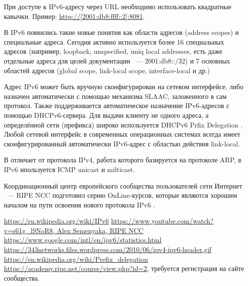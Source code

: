 \documentclass[10pt, a5paper]{article}
\begin{document}
При доступе к IPv6-адресу через URL необходимо использовать квадратные кавычки. Пример: \url{ http://[2001:db8:ffff::2]:8081}.

В IPv6 появились такие новые понятия как области адресов (address scopes) и специальные адреса. Сегодня активно используется более 16 специальных адресов (например, loopback, unspecified, uniq local addresses, есть даже отдельные адреса для целей документации ~--- 2001:db8::/32) и 7 основных областей адресов (global scope, link-local scope, interface-local и др.)

Адрес IPv6 может быть вручную сконфигурирован на сетевом интерфейсе, либо назначен автоматически с помощью механизма SLAAC, заложенного в сам протокол. Также поддерживается автоматическое назначение IPv6-адресов с помощью DHCPv6-сервера. Для выдачи клиенту не одного адреса, а определённой сети (префикса) широко используется DHCPv6 Prfix Delegation \cite{Semernik-4}. Любой сетевой интерфейс в современных операционных системах всегда имеет сконфигурированный автоматически IPv6-адрес с областью действия link-local.

В отличает от протокола IPv4, работа которого базируется на протоколе ARP, в IPv6 ипользуется ICMP unicast и milticast.

Координационный центр европейского сообщества пользователей сети Интернет ~--- RIPE NCC подготовил серию OnLine-курсов, которые являются хорошим началом на пути освоения нового протокола IPv6 \cite{Semernik-5}.

\begin{thebibliography}{20}
\url{https://ru.wikipedia.org/wiki/IPv6}
\url{https://www.youtube.com/watch?v=s61g\_l9NoR8, Alex Semenyaka, RIPE NCC}
\url{https://www.google.com/intl/en/ipv6/statistics.html}
\url{https://343networks.files.wordpress.com/2010/06/ipv4-ipv6-header.gif}
\url{https://en.wikipedia.org/wiki/Prefix\_delegation}
\url{https://academy.ripe.net/course/view.php?id=2}, требуется регистрация на сайте сообщества.
\end{thebibliography}
\end{document}
